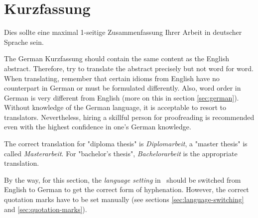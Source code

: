 \chapter{Kurzfassung}

\begin{german} %
	Dies sollte eine maximal 1-seitige Zusammenfassung Ihrer Arbeit in deutscher
	Sprache sein.
\end{german}

The German Kurzfassung should contain the same content as the English abstract.
Therefore, try to translate the abstract precisely but not word for word. When
translating, remember that certain idioms from English have no counterpart in
German or must be formulated differently. Also, word order in German is very
different from English (more on this in section \ref{sec:german}). Without
knowledge of the German language, it is acceptable to resort to translators.
Nevertheless, hiring a skillful person for proofreading is recommended
even with the highest confidence in one's German knowledge.

The correct translation for "diploma thesis" is \emph{Diplomarbeit}, a "master
thesis" is called \emph{Masterarbeit}. For "bachelor's thesis",
\emph{Bachelorarbeit} is the appropriate translation.

By the way, for this section, the \emph{language setting} in \latex\ should be
switched from English to German to get the correct form of hyphenation. However,
the correct quotation marks have to be set manually (see sections
\ref{sec:language-switching} and \ref{sec:quotation-marks}).
